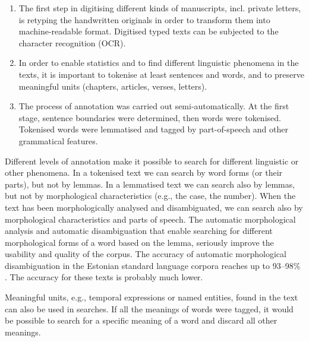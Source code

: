 \documentclass[runningheads]{llncs}
\begin{document}
\begin{enumerate}
\item The first step in digitising different kinds of manuscripts, incl. private letters, is retyping the handwritten originals in order to transform them into machine-readable format. Digitised typed texts can be subjected to the character recognition (OCR). 

\item In order to enable statistics and to find different linguistic phenomena in the texts, it is important to tokenise at least sentences and words, and to preserve meaningful units (chapters, articles, verses, letters). 

  \item The process of annotation was carried out semi-automatically. At the first stage, sentence boundaries were determined, then words were tokenised. Tokenised words were lemmatised and tagged by part-of-speech and other grammatical features.

\end{enumerate}

Different levels of annotation make it possible to search for different linguistic or other phenomena. In a tokenised text we can search by word forms (or their parts), but not by lemmas. In a lemmatised text we can search also by lemmas, but not by morphological characteristics (e.g., the case, the number). When the text has been morphologically analysed and disambiguated, we can search also by morphological characteristics and parts of speech. The automatic morphological analysis and automatic disambiguation that enable searching for different morphological forms of a word based on the lemma, seriously improve the usability and quality of the corpus. The accuracy of automatic morphological disambiguation in the Estonian standard language corpora reaches up to 93--98\% \cite{veskisliba}.  The accuracy for these texts is probably much lower.


Meaningful units, e.g., temporal expressions or named entities, found in the text can also be used in searches. If all the meanings of words were tagged, it would be possible to search for a specific meaning of a word and discard all other meanings. 
\end{document}

